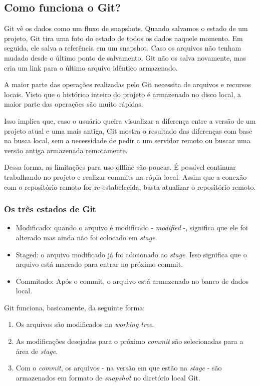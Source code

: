\subsection{Como funciona o Git?}
    Git vê os dados como um fluxo de snapshots. Quando salvamos o estado de um projeto, Git tira uma foto do estado de todos os dados naquele momento. Em seguida, ele salva a referência em um snapshot.
    Caso os arquivos não tenham mudado desde o último ponto de salvamento, Git não os salva novamente, mas cria um link para o último arquivo idêntico armazenado.
    \par A maior parte das operações realizadas pelo Git necessita de arquivos e recursos locais. Visto que o histórico inteiro do projeto é armazenado no disco local, a maior parte das operações são muito rápidas.
    \par Isso implica que, caso o usuário queira visualizar a diferença entre a versão de um projeto atual e uma mais antiga, Git mostra o resultado das diferenças com base na busca local, sem a necessidade de pedir a um servidor remoto ou buscar uma versão antiga armazenada remotamente.
    \par Dessa forma, as limitações para uso offline são poucas. É possível continuar trabalhando no projeto e realizar commits na cópia local. Assim que a conexão com o repositório remoto for re-estabelecida, basta atualizar o repositório remoto.

    \subsubsection{Os três estados de Git}
        \begin{itemize}
            \item Modificado: quando o arquivo é modificado - \textit{modified} -,
            significa que ele foi alterado mas ainda não foi colocado em \textit{stage}.
            \item Staged: o arquivo modificado já foi adicionado ao \textit{stage}. Isso significa que o arquivo está marcado para entrar no próximo commit.
            \item Commitado: Após o commit, o arquivo está armazenado no banco de dados local.
        \end{itemize}

        Git funciona, basicamente, da seguinte forma:
        \begin{enumerate}
            \item Os arquivos são modificados na \textit{working tree}.
            \item As modificações desejadas para o próximo \textit{commit} são selecionadas para a área de \textit{stage}.
            \item Com o \textit{commit}, os arquivos - na versão em que estão na \textit{stage} - são armazenados em formato de \textit{snapshot} no diretório local Git.
        \end{enumerate}

